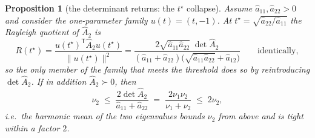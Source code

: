 \documentclass[11pt,a4paper]{article}
\theoremstyle{plain}
\newtheorem{proposition}[theorem]{Proposition}
\theoremstyle{definition}
\newcommand{\T}{\mathsf{T}}
\newcommand{\PD}{\succ 0}
\newcommand{\Ah}{\widehat{A}}
\newcommand{\ah}{\widehat{a}}
\begin{document}
\begin{proposition}[the determinant returns: the $t^{\star}$ collapse]
\label{prop:collapse}
Assume $\ah_{11},\ah_{22}>0$ and consider the one-parameter family
$u(t)=(t,-1)$. At $t^{\star}=\sqrt{\ah_{22}/\ah_{11}}$ the Rayleigh quotient of
$\Ah_2$ is
\begin{equation}
\label{eq:collapse}
  R(t^{\star})
  =\frac{u(t^{\star})^{\T}\Ah_2u(t^{\star})}{\lVert u(t^{\star})\rVert^{2}}
  =\frac{2\sqrt{\ah_{11}\ah_{22}}\;\det\Ah_2}
        {(\ah_{11}+\ah_{22})\bigl(\sqrt{\ah_{11}\ah_{22}}+\ah_{12}\bigr)}
  \qquad\text{identically},
\end{equation}
so the only member of the family that meets the threshold does so by
reintroducing $\det\Ah_2$. If in addition $\Ah_2\PD$, then
\begin{equation}
\label{eq:harmonic}
  \nu_2\;\le\;\frac{2\det\Ah_2}{\ah_{11}+\ah_{22}}
  \;=\;\frac{2\nu_1\nu_2}{\nu_1+\nu_2}\;\le\;2\nu_2,
\end{equation}
i.e.\ the harmonic mean of the two eigenvalues bounds $\nu_2$ from above and is
tight within a factor $2$.
\end{proposition}
\end{document}
